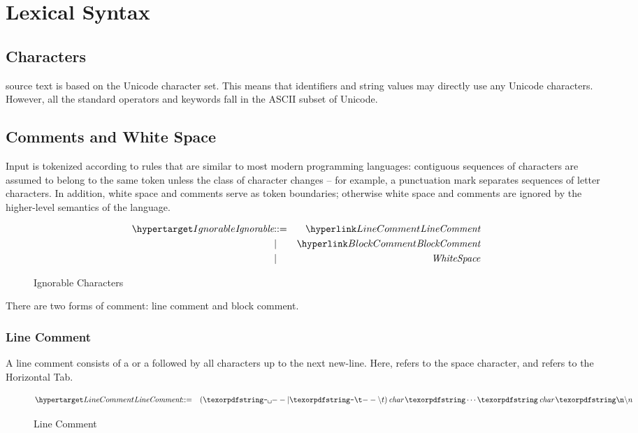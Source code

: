 \chapter{Lexical Syntax}
\label{lexical}

\section{Characters}
\Sr source text is based on the Unicode\tm{} character set. This means that identifiers and string values may directly use any Unicode characters. However, all the standard operators and keywords fall in the ASCII subset of Unicode.

\section{Comments and White Space}

Input is tokenized according to rules that are similar to most modern programming languages: contiguous sequences of characters are assumed to belong to the same token unless the class of character changes -- for example, a punctuation mark separates sequences of letter characters. In addition, white space and comments serve as token boundaries; otherwise white space and comments are ignored by the higher-level semantics of the language.

\begin{figure}[htbp]
\begin{eqnarray*}
\ntDef{Ignorable}&\arrow&\ntRef{LineComment}\\
&\choice&\ntRef{BlockComment}\\
&\choice&\emph{WhiteSpace}
\end{eqnarray*}
\caption{Ignorable Characters}
\label{ignorableFig}
\end{figure}

There are two forms of comment: line comment and block comment.

\subsection{Line Comment}
A line comment consists of a \q{--\spce} or a  followed by all characters up to the next new-line. Here, \q{\spce} refers to the space character, and  refers to the Horizontal Tab. 

\begin{figure}[htbp]
\begin{eqnarray*}
\ntDef{LineComment}&\arrow&(\q{--\spce}\choice\q{--\bsl{}t})\,\emph{char}\sequence{}\emph{char}\,\q{\bsl{}n}
\end{eqnarray*}
\caption{Line Comment}
\label{lineCommentFig}
\end{figure}


